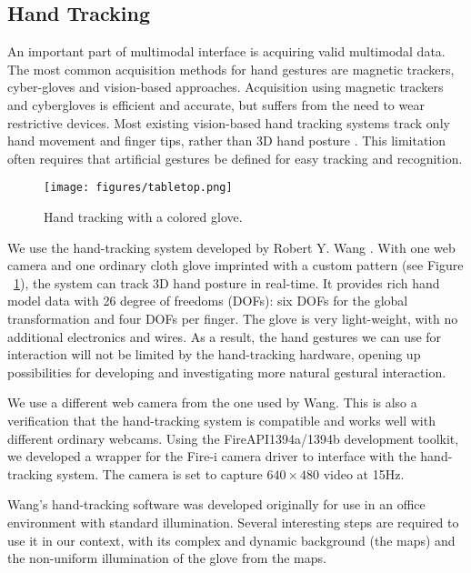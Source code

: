 \subsection{Hand Tracking}
An important part of multimodal interface is acquiring valid multimodal data. The most common acquisition methods for hand gestures are magnetic trackers, cyber-gloves and vision-based approaches. Acquisition using magnetic trackers and cybergloves is efficient and accurate, but suffers from the need to wear restrictive devices. Most existing vision-based hand tracking systems track only hand movement and finger tips, rather than 3D hand posture \cite{Demirdjian03}\cite{Oka02}\cite{Rauschert02}. This limitation often requires that artificial gestures be defined for easy tracking and recognition.  

\begin{figure}
	\centering
	\texttt{[image: figures/tabletop.png]} 
	\caption{Hand tracking with a colored glove.} \label{fig:tabletop}
\end{figure}

We use the hand-tracking system developed by Robert Y. Wang \cite{Wang09}. With one web camera and one ordinary cloth glove imprinted with a custom pattern (see Figure ~\ref{fig:tabletop}), the system can track 3D hand posture in real-time. It provides rich hand model data with 26 degree of freedoms (DOFs): six DOFs for the global transformation and four DOFs per finger. The glove is very light-weight, with no additional electronics and wires. As a result, the hand gestures we can use for interaction will not be limited by the hand-tracking hardware, opening up possibilities for developing and investigating more natural gestural interaction.

We use a different web camera from the one used by Wang. This is also a verification that the hand-tracking system is compatible and works well with different ordinary webcams. Using the FireAPI\texttrademark 1394a/1394b development toolkit, we developed a wrapper for the Fire-i camera driver to interface with the hand-tracking system. The camera is set to capture $640 \times 480$ video at 15Hz.  

Wang's hand-tracking software was developed originally for use in an office environment with standard illumination. Several interesting steps are required to use it in our context, with its complex and dynamic background (the maps) and the non-uniform illumination of the glove from the maps. 

